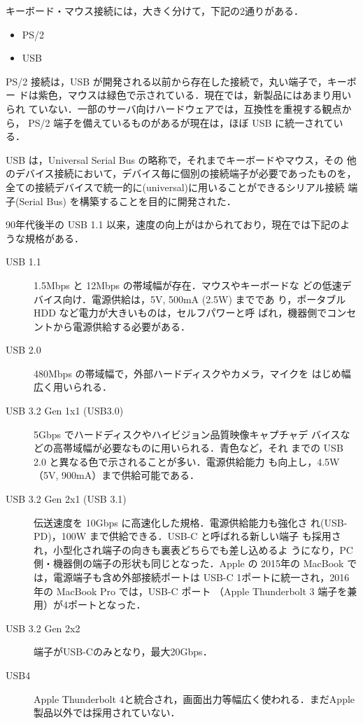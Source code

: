 キーボード・マウス接続には，大きく分けて，下記の2通りがある．
\begin{itemize}
 \item PS/2
 \item USB
\end{itemize}

PS/2 接続は，USB が開発される以前から存在した接続で，丸い端子で，キーボー
ドは紫色，マウスは緑色で示されている．現在では，新製品にはあまり用いられ
ていない．一部のサーバ向けハードウェアでは，互換性を重視する観点から，
PS/2 端子を備えているものがあるが現在は，ほぼ USB に統一されている．

USB は，Universal Serial Bus の略称で，それまでキーボードやマウス，その
他のデバイス接続において，デバイス毎に個別の接続端子が必要であったものを，
全ての接続デバイスで統一的に(universal)に用いることができるシリアル接続
端子(Serial Bus) を構築することを目的に開発された．

90年代後半の USB 1.1 以来，速度の向上がはかられており，現在では下記のよ
うな規格がある．

\begin{description}
 \item[USB 1.1] 1.5Mbps と 12Mbps の帯域幅が存在．マウスやキーボードな
	    どの低速デバイス向け．電源供給は，5V, 500mA (2.5W) までであ
	    り，ポータブル HDD など電力が大きいものは，セルフパワーと呼
	    ばれ，機器側でコンセントから電源供給する必要がある．
 \item[USB 2.0] 480Mbps の帯域幅で，外部ハードディスクやカメラ，マイクを
	    はじめ幅広く用いられる．
 \item[USB 3.2 Gen 1x1 (USB3.0)] 5Gbps でハードディスクやハイビジョン品質映像キャプチャデ
	    バイスなどの高帯域幅が必要なものに用いられる．青色など，それ
	    までの USB 2.0 と異なる色で示されることが多い．電源供給能力
	    も向上し，4.5W（5V, 900mA）まで供給可能である．
 \item[USB 3.2 Gen 2x1 (USB 3.1)] 伝送速度を 10Gbps に高速化した規格．電源供給能力も強化さ
	    れ(USB-PD)，100W まで供給できる．USB-C と呼ばれる新しい端子
	    も採用され，小型化され端子の向きも裏表どちらでも差し込めるよ
	    うになり，PC側・機器側の端子の形状も同じとなった．Apple の
	    2015年の MacBook では，電源端子も含め外部接続ポートは USB-C
	    1ポートに統一され，2016年の MacBook Pro では，USB-C ポート
	    （Apple Thunderbolt 3 端子を兼用）が4ポートとなった．
 \item[USB 3.2 Gen 2x2] 端子がUSB-Cのみとなり，最大20Gbps．
 \item[USB4] Apple Thunderbolt 4と統合され，画面出力等幅広く使われる．まだApple製品以外では採用されていない．
\end{description}

